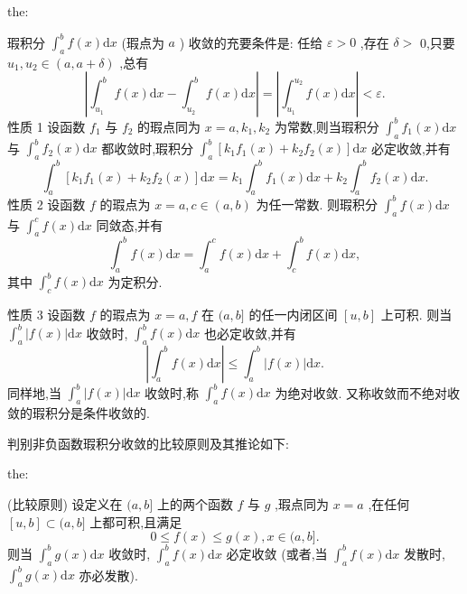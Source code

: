 \begin{theorem}{}{the:}

\end{theorem}
 瑕积分 \({\int }_{a}^{b}f\left( x\right) \mathrm{d}x\) (瑕点为 \(a\) ) 收敛的充要条件是: 任给 \(\varepsilon  > 0\) ,存在 \(\delta  >\) 0,只要 \({u}_{1},{u}_{2} \in  \left( {a,a + \delta }\right)\) ,总有
\[
\left| {{\int }_{{u}_{1}}^{b}f\left( x\right) \mathrm{d}x - {\int }_{{u}_{2}}^{b}f\left( x\right) \mathrm{d}x}\right|  = \left| {{\int }_{{u}_{1}}^{{u}_{2}}f\left( x\right) \mathrm{d}x}\right|  < \varepsilon .
\]
性质 1 设函数 \({f}_{1}\) 与 \({f}_{2}\) 的瑕点同为 \(x = a,{k}_{1},{k}_{2}\) 为常数,则当瑕积分 \({\int }_{a}^{b}{f}_{1}\left( x\right) \mathrm{d}x\) 与 \({\int }_{a}^{b}{f}_{2}\left( x\right) \mathrm{d}x\) 都收敛时,瑕积分 \({\int }_{a}^{b}\left\lbrack  {{k}_{1}{f}_{1}\left( x\right)  + {k}_{2}{f}_{2}\left( x\right) }\right\rbrack  \mathrm{d}x\) 必定收敛,并有
\[
{\int }_{a}^{b}\left\lbrack  {{k}_{1}{f}_{1}\left( x\right)  + {k}_{2}{f}_{2}\left( x\right) }\right\rbrack  \mathrm{d}x = {k}_{1}{\int }_{a}^{b}{f}_{1}\left( x\right) \mathrm{d}x + {k}_{2}{\int }_{a}^{b}{f}_{2}\left( x\right) \mathrm{d}x. \tag{1}
\]
性质 2 设函数 \(f\) 的瑕点为 \(x = a,c \in  \left( {a,b}\right)\) 为任一常数. 则瑕积分 \({\int }_{a}^{b}f\left( x\right) \mathrm{d}x\) 与 \({\int }_{a}^{c}f\left( x\right) \mathrm{d}x\) 同敛态,并有
\[
{\int }_{a}^{b}f\left( x\right) \mathrm{d}x = {\int }_{a}^{c}f\left( x\right) \mathrm{d}x + {\int }_{c}^{b}f\left( x\right) \mathrm{d}x, \tag{2}
\]
其中 \({\int }_{c}^{b}f\left( x\right) \mathrm{d}x\) 为定积分.

性质 3 设函数 \(f\) 的瑕点为 \(x = a,f\) 在 \((a,b\rbrack\) 的任一内闭区间 \(\left\lbrack  {u,b}\right\rbrack\) 上可积. 则当 \({\int }_{a}^{b}\left| {f\left( x\right) }\right| \mathrm{d}x\) 收敛时, \({\int }_{a}^{b}f\left( x\right) \mathrm{d}x\) 也必定收敛,并有
\[
\left| {{\int }_{a}^{b}f\left( x\right) \mathrm{d}x}\right|  \leq  {\int }_{a}^{b}\left| {f\left( x\right) }\right| \mathrm{d}x. \tag{3}
\]
同样地,当 \({\int }_{a}^{b}\left| {f\left( x\right) }\right| \mathrm{d}x\) 收敛时,称 \({\int }_{a}^{b}f\left( x\right) \mathrm{d}x\) 为绝对收敛. 又称收敛而不绝对收敛的瑕积分是条件收敛的.

判别非负函数瑕积分收敛的比较原则及其推论如下:

\begin{theorem}{}{the:}

\end{theorem}
 (比较原则) 设定义在 \((a,b\rbrack\) 上的两个函数 \(f\) 与 \(g\) ,瑕点同为 \(x = a\) ,在任何 \(\left\lbrack  {u,b}\right\rbrack   \subset  (a,b\rbrack\) 上都可积,且满足
\[
0 \leq  f\left( x\right)  \leq  g\left( x\right) ,x \in  (a,b\rbrack .
\]
则当 \({\int }_{a}^{b}g\left( x\right) \mathrm{d}x\) 收敛时, \({\int }_{a}^{b}f\left( x\right) \mathrm{d}x\) 必定收敛 (或者,当 \({\int }_{a}^{b}f\left( x\right) \mathrm{d}x\) 发散时, \({\int }_{a}^{b}g\left( x\right) \mathrm{d}x\) 亦必发散).

